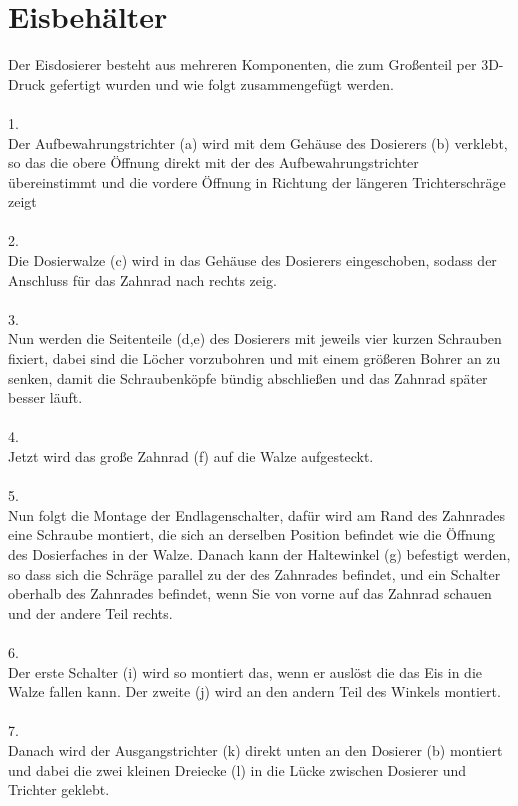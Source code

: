 \documentclass[10pt,a4paper]{report}
\begin{document}
	\chapter{Eisbehälter}
	Der Eisdosierer besteht aus mehreren Komponenten, die zum Großenteil per 3D-Druck gefertigt wurden und wie folgt zusammengefügt werden.\\
	\\
	1.\\	
	Der Aufbewahrungstrichter (a) wird mit dem Gehäuse des Dosierers (b) verklebt, so das die obere Öffnung direkt mit der des Aufbewahrungstrichter übereinstimmt und die vordere Öffnung in Richtung der längeren Trichterschräge zeigt\\
	\\
	2.\\
	Die Dosierwalze (c) wird in das Gehäuse des Dosierers eingeschoben, sodass der Anschluss für das Zahnrad nach rechts zeig.\\
	\\
	3.\\
	Nun werden die Seitenteile (d,e) des Dosierers mit jeweils vier kurzen Schrauben fixiert, dabei sind die Löcher vorzubohren und mit einem größeren Bohrer an zu senken, damit die Schraubenköpfe bündig abschließen und das Zahnrad später besser läuft.\\
	\\
	4.\\
	Jetzt wird das große Zahnrad (f) auf die Walze aufgesteckt.\\
	\\
	5.\\
	Nun folgt die Montage der Endlagenschalter, dafür wird am Rand des Zahnrades eine Schraube montiert, die sich an derselben Position befindet wie die Öffnung des Dosierfaches in der Walze. Danach kann der Haltewinkel (g) befestigt werden, so dass sich die Schräge parallel zu der des Zahnrades befindet, und ein Schalter oberhalb des Zahnrades befindet, wenn Sie von vorne auf das Zahnrad schauen und der andere Teil rechts.\\
	\\
	6.\\
	Der erste Schalter (i) wird so montiert das, wenn er auslöst die das Eis in die Walze fallen kann. Der zweite (j) wird an den andern Teil des Winkels montiert.\\
	\\
	7.\\
	Danach wird der Ausgangstrichter (k) direkt unten an den Dosierer (b) montiert und dabei die zwei kleinen Dreiecke (l) in die Lücke zwischen Dosierer und Trichter geklebt.\\
\end{document}
